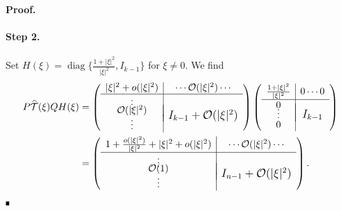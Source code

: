 \documentclass[letterpaper,11pt]{article}
\newcommand{\rmO}{\mathcal{O}}
\newcommand{\That}{\widehat{\mathcal{T}}}
\newcommand{\diag}{\operatorname{diag}}
\numberwithin{equation}{section}
\theoremstyle{plain}
\theoremstyle{remark}
\newenvironment{Proof}[1][.]%
 {\begin{trivlist}\item[]\textbf{Proof#1 }}%
 {\hspace*{\fill}$\rule{0.3\baselineskip}{0.35\baselineskip}$\end{trivlist}}
\begin{document}
\begin{Proof}



\paragraph{Step 2.} Set $
H(\xi) = \diag\{\frac{1+|\xi|^2}{|\xi|^2}, I_{k-1}\}$ for $\xi \neq 0$. 
We find
\begin{align*}
P\That(\xi)QH(\xi) &= \left(
\begin{array}{c|c}
  |\xi|^2+o(|\xi|^2) &  \cdots \rmO(|\xi|^2)\cdots \\ \hline
  \vdots & \raisebox{-10pt}{{\large\mbox{{$I_{k-1}+\rmO(|\xi|^2)$}}}} \\[-4ex]
  \rmO(|\xi|^2) & \\[-0.5ex]
  \vdots &
\end{array}\right)\left(
\begin{array}{c|c}
  \frac{1+|\xi|^2}{|\xi|^2} & 0 \cdots 0 \\ \hline
  0 & \raisebox{-10pt}{{\large\mbox{{$I_{k-1}$}}}} \\[-4ex]
  \vdots & \\[-0.5ex]
  0 &
\end{array}\right)\\
&= \left(
\begin{array}{c|c}
  1+\frac{o(|\xi|^2)}{|\xi|^2} + |\xi|^2+o(|\xi|^2) &  \cdots \rmO(|\xi|^2)\cdots \\ \hline
  \vdots & \raisebox{-10pt}{{\large\mbox{{$I_{n-1}+\rmO(|\xi|^2)$}}}} \\[-4ex]
  \rmO(1) & \\[-0.5ex]
  \vdots &
\end{array}\right) .
\end{align*} 


\end{Proof}
\end{document}
